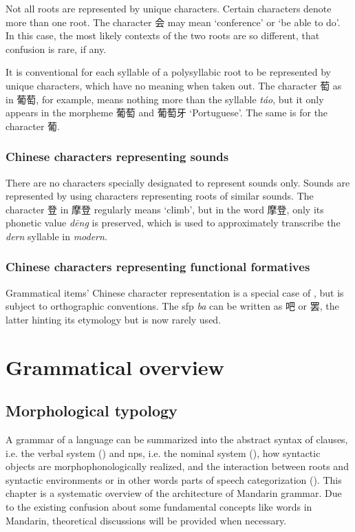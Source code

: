 \documentclass[UTF8, a4paper, oneside, scheme=plain, 12pt]{ctexrep}
\newcommand{\form}[1]{\emph{#1}}
\newcommand{\translate}[1]{`#1'}
\begin{document}
Not all roots are represented by unique characters.
Certain characters denote more than one root.
The character 会 may mean \translate{conference} or \translate{be able to do}. 
In this case, the most likely contexts of the two roots are so different,
that confusion is rare, if any.

It is conventional for each syllable of a polysyllabic root
to be represented by unique characters,
which have no meaning when taken out.
The character 萄 as in 葡萄, for example, 
means nothing more than the syllable \form{t\'{a}o},
but it only appears in the morpheme 葡萄 and 葡萄牙 \translate{Portuguese}.
The same is for the character 葡.

\subsection{Chinese characters representing sounds}\label{sec:writing.sound}

There are no characters specially designated to represent sounds only.
Sounds are represented by using characters representing roots of similar sounds.
The character 登 in 摩登 regularly means \translate{climb},
but in the word 摩登, only its phonetic value \form{d\={e}ng} is preserved,
which is used to approximately transcribe the \form{dern} syllable in \form{modern}.

\subsection{Chinese characters representing functional formatives}

Grammatical items' Chinese character representation
is a special case of ,
but is subject to orthographic conventions.
The \ac{sfp} \form{ba} can be written as 吧 or 罢,
the latter hinting its etymology but is now rarely used.

\chapter{Grammatical overview}

\section{Morphological typology}

A grammar of a language can be summarized into the abstract syntax of clauses, i.e. the verbal system () 
and \acfp{np}, i.e. the nominal system (),
how syntactic objects are morphophonologically realized,
and the interaction between roots and syntactic environments
or in other words parts of speech categorization
().
This chapter is a systematic overview of the architecture of Mandarin grammar.
Due to the existing confusion about some fundamental concepts like words in Mandarin,
theoretical discussions will be provided when necessary.
\end{document}
